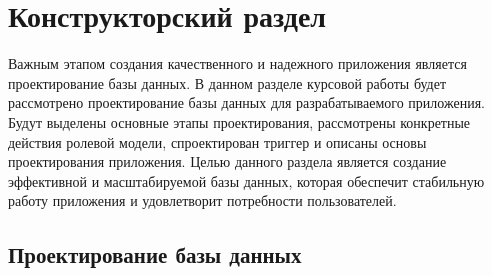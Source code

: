  \section{Конструкторский раздел} \label{desing}

Важным этапом создания качественного и надежного приложения является проектирование базы данных. В данном разделе курсовой работы будет рассмотрено проектирование базы данных для разрабатываемого приложения. Будут выделены основные этапы проектирования, рассмотрены конкретные действия ролевой модели, спроектирован триггер и описаны основы проектирования приложения. Целью данного раздела является создание эффективной и масштабируемой базы данных, которая обеспечит стабильную работу приложения и удовлетворит потребности пользователей.

\subsection{Проектирование базы данных}

